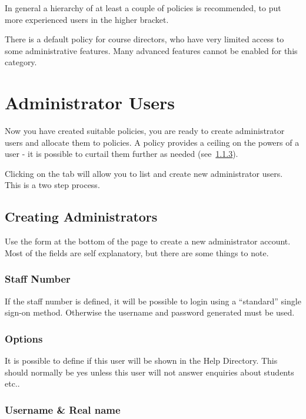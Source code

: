 \documentclass[12 pt]{book}
\begin{document}
In general a hierarchy of at least a couple of policies is recommended, to put
more experienced users in the higher bracket.

There is a default policy for course directors, who have very limited access to
some administrative features. Many advanced features cannot be enabled
for this category.

\section{Administrator Users}

Now you have created suitable policies, you are ready to create administrator
users and allocate them to policies. A policy provides a ceiling on the powers
of a user - it is possible to curtail them further as needed (see~\ref{}).

Clicking on the  tab will allow you to list and
create new administrator users. This is a two step process.

\subsection{Creating Administrators}

Use the form at the bottom of the page to create a new administrator account.
Most of the fields are self explanatory, but there are some things to note.

\subsubsection{Staff Number}

If the staff number is defined, it will be possible to login using a ``standard''
single sign-on method. Otherwise the username and password generated must be used.

\subsubsection{Options}

It is possible to define if this user will be shown in the Help Directory. This
should normally be yes unless this user will not answer enquiries about students etc..

\subsubsection{Username \& Real name}
\end{document}

